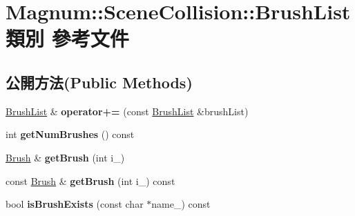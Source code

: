 \hypertarget{class_magnum_1_1_scene_collision_1_1_brush_list}{}\section{Magnum\+:\+:Scene\+Collision\+:\+:Brush\+List 類別 參考文件}
\label{class_magnum_1_1_scene_collision_1_1_brush_list}
\subsection*{公開方法(Public Methods)}
\begin{DoxyCompactItemize}
\item 
\hyperlink{class_magnum_1_1_scene_collision_1_1_brush_list}{Brush\+List} \& {\bfseries operator+=} (const \hyperlink{class_magnum_1_1_scene_collision_1_1_brush_list}{Brush\+List} \&brush\+List)\hypertarget{class_magnum_1_1_scene_collision_1_1_brush_list_aba29e308fc129fd9c3f97ef2346f9ca9}{}\label{class_magnum_1_1_scene_collision_1_1_brush_list_aba29e308fc129fd9c3f97ef2346f9ca9}

\item 
int {\bfseries get\+Num\+Brushes} () const \hypertarget{class_magnum_1_1_scene_collision_1_1_brush_list_ae88aecb837a7bf3674c089823b0c2c1e}{}\label{class_magnum_1_1_scene_collision_1_1_brush_list_ae88aecb837a7bf3674c089823b0c2c1e}

\item 
\hyperlink{class_magnum_1_1_scene_collision_1_1_brush}{Brush} \& {\bfseries get\+Brush} (int i\+\_\+)\hypertarget{class_magnum_1_1_scene_collision_1_1_brush_list_aa584d14d5ce9db2fc317a7e03d529f37}{}\label{class_magnum_1_1_scene_collision_1_1_brush_list_aa584d14d5ce9db2fc317a7e03d529f37}

\item 
const \hyperlink{class_magnum_1_1_scene_collision_1_1_brush}{Brush} \& {\bfseries get\+Brush} (int i\+\_\+) const \hypertarget{class_magnum_1_1_scene_collision_1_1_brush_list_af44c97065c29118473488e8f935c6e59}{}\label{class_magnum_1_1_scene_collision_1_1_brush_list_af44c97065c29118473488e8f935c6e59}

\item 
bool {\bfseries is\+Brush\+Exists} (const char $\ast$name\+\_\+) const \hypertarget{class_magnum_1_1_scene_collision_1_1_brush_list_a7f3e8b4fd00c207a036151874d6b952a}{}\label{class_magnum_1_1_scene_collision_1_1_brush_list_a7f3e8b4fd00c207a036151874d6b952a}


\end{DoxyCompactItemize}
